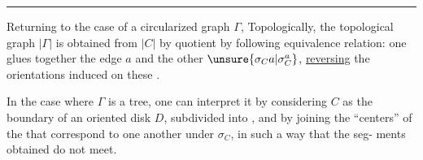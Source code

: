 \par\noindent\rule{\linewidth}{.4pt}

Returning to the case of a  circularized graph $\Gamma$,
Topologically, the topological graph $|\Gamma|$
is obtained from $|C|$ by 
 quotient by  following equivalence %
relation: one glues together
the edge $a$ and the other $\unsure{\sigma_C a|\sigma_C^a}$, \uline{reversing} the
orientations induced on these .

In the case where $\Gamma$ is a
tree, one can interpret
it  by considering
$C$ as the boundary
of an oriented disk $D$,
subdivided into , and
by joining the ``centers''
of the  that correspond to one another
under $\sigma_C$, in such a way that the seg-\linebreak
ments obtained do not meet.

